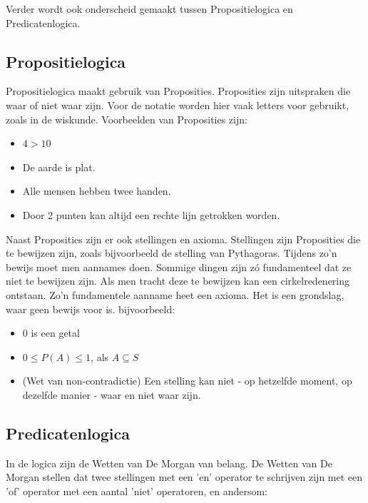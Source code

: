\documentclass{article}
\begin{document}
	Verder wordt ook onderscheid gemaakt tussen Propositielogica en Predicatenlogica.
	
		\subsection{Propositielogica}
		
		Propositielogica maakt gebruik van Proposities. Proposities zijn uitspraken die waar of niet waar zijn. Voor de notatie worden hier vaak letters voor gebruikt, zoals in de wiskunde. Voorbeelden van Proposities zijn:

		\begin{itemize}
			\item \( 4 > 10 \)
			\item De aarde is plat.
			\item Alle mensen hebben twee handen.
			\item Door 2 punten kan altijd een rechte lijn getrokken worden.
		\end{itemize}

		Naast Proposities zijn er ook stellingen en axioma. Stellingen zijn Proposities die te bewijzen zijn, zoals bijvoorbeeld de stelling van Pythagoras. Tijdens zo'n bewijs moet men aannames doen. Sommige dingen zijn zó fundamenteel dat ze niet te bewijzen zijn. Als men tracht deze te bewijzen kan een cirkelredenering ontstaan. Zo'n fundamentele aanname heet een axioma. Het is een grondslag, waar geen bewijs voor is. bijvoorbeeld:

		\begin{itemize}
			\item 0 is een getal
			\item \( 0 \leq P(A) \leq 1 \), als \( A \subseteq S \)
			\item (Wet van non-contradictie) Een stelling kan niet - op hetzelfde moment, op dezelfde manier - waar en niet waar zijn.
		\end{itemize}
		
		\subsection{Predicatenlogica}
		
		In de logica zijn de Wetten van De Morgan van belang. De Wetten van De Morgan stellen dat twee stellingen met een 'en' operator te schrijven zijn met een 'of' operator met een aantal 'niet' operatoren, en andersom:
	
\end{document}
